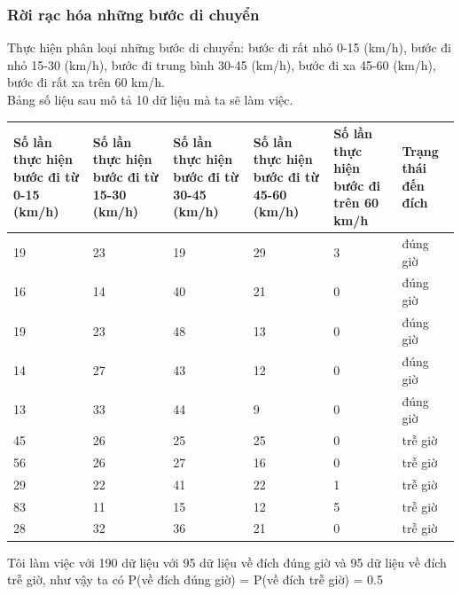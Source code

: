 \documentclass[a4paper, 13pt]{report}
\begin{document}
\subsubsection{Rời rạc hóa những bước di chuyển}
Thực hiện phân loại những bước di chuyển: bước đi rất nhỏ 0-15 (km/h), bước đi nhỏ 15-30 (km/h), bước đi trung bình 30-45 (km/h), bước đi xa 45-60 (km/h), bước đi rất xa trên 60 km/h.\\
Bảng số liệu sau mô tả 10 dữ liệu mà ta sẽ làm việc.\\
\begin{flushleft}
\begin{tabular}{|p{2.6cm}|p{2.6cm}|p{2.6cm}|p{2.6cm}|p{2.6cm}|p{1.5cm}|}
\hline
Số lần thực hiện bước đi từ 0-15 (km/h)& Số lần thực hiện bước đi từ 15-30 (km/h) & Số lần thực hiện bước đi từ 30-45 (km/h) & Số lần thực hiện bước đi từ 45-60 (km/h) & Số lần thực hiện bước đi trên 60 km/h & Trạng thái đến đích \\ 
\hline
19 & 23 & 19 & 29 & 3 & đúng giờ\\
\hline
16 & 14 & 40 & 21 & 0 & đúng giờ\\
\hline
19 & 23 & 48 & 13 & 0 & đúng giờ\\
\hline
14 & 27 & 43 & 12 & 0 & đúng giờ\\
\hline
13 & 33 & 44 & 9 & 0 & đúng giờ \\
\hline
45 & 26 & 25 & 25 & 0 & trễ giờ\\
\hline
56 & 26 & 27 & 16 & 0 & trễ giờ\\
\hline
29 & 22 & 41 & 22 & 1 & trễ giờ\\
\hline
83 & 11 & 15 & 12 & 5 & trễ giờ\\
\hline
28 & 32 & 36 & 21 & 0 & trễ giờ\\
\hline
\end{tabular}
\end{flushleft}
Tôi làm việc với 190 dữ liệu với 95 dữ liệu về đích đúng giờ và 95 dữ liệu về đích trễ giờ, như vậy ta có 
$\mathrm{P}$(về đích đúng giờ) = $\mathrm{P}$(về đích trễ giờ) = 0.5  
\end{document}
